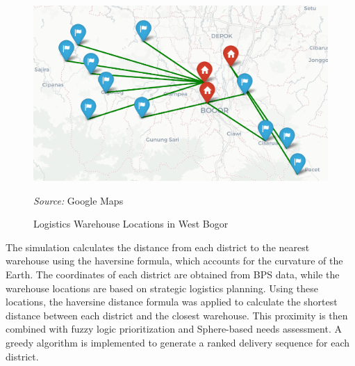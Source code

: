 \documentclass[conference,final,a4paper,twoside,10pt]{IEEEtran}
\begin{document}
\begin{figure}[H]
    \centerline{\includegraphics[width=0.9\linewidth]{fig8.png}}
    \caption{Logistics Warehouse Locations in West Bogor}
    \label{fig:warehouse_location}
    \footnotesize{\textit{Source:} Google Maps}
\end{figure}

The simulation calculates the distance from each district to the nearest warehouse using the haversine formula, which accounts for the curvature of the Earth. The coordinates of each district are obtained from BPS data, while the warehouse locations are based on strategic logistics planning.
Using these locations, the haversine distance formula was applied to calculate the shortest distance between each district and the closest warehouse. This proximity is then combined with fuzzy logic prioritization and Sphere-based needs assessment. A greedy algorithm is implemented to generate a ranked delivery sequence for each district.
\end{document}
